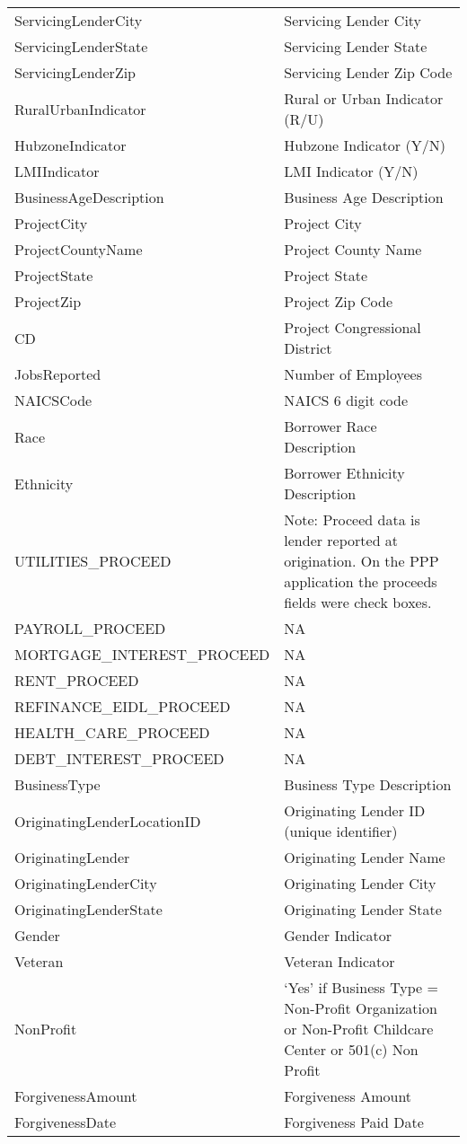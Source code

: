\documentclass[
  letterpaper,
  DIV=11,
  numbers=noendperiod]{scrartcl}
\begin{document}
\begin{longtable}[]{@{}
  >{\raggedright\arraybackslash}p{}
  >{\raggedright\arraybackslash}p{}@{}}
ServicingLenderCity & Servicing Lender City \\
ServicingLenderState & Servicing Lender State \\
ServicingLenderZip & Servicing Lender Zip Code \\
RuralUrbanIndicator & Rural or Urban Indicator (R/U) \\
HubzoneIndicator & Hubzone Indicator (Y/N) \\
LMIIndicator & LMI Indicator (Y/N) \\
BusinessAgeDescription & Business Age Description \\
ProjectCity & Project City \\
ProjectCountyName & Project County Name \\
ProjectState & Project State \\
ProjectZip & Project Zip Code \\
CD & Project Congressional District \\
JobsReported & Number of Employees \\
NAICSCode & NAICS 6 digit code \\
Race & Borrower Race Description \\
Ethnicity & Borrower Ethnicity Description \\
UTILITIES\_PROCEED & Note: Proceed data is lender reported at
origination. On the PPP application the proceeds fields were check
boxes. \\
PAYROLL\_PROCEED & NA \\
MORTGAGE\_INTEREST\_PROCEED & NA \\
RENT\_PROCEED & NA \\
REFINANCE\_EIDL\_PROCEED & NA \\
HEALTH\_CARE\_PROCEED & NA \\
DEBT\_INTEREST\_PROCEED & NA \\
BusinessType & Business Type Description \\
OriginatingLenderLocationID & Originating Lender ID (unique
identifier) \\
OriginatingLender & Originating Lender Name \\
OriginatingLenderCity & Originating Lender City \\
OriginatingLenderState & Originating Lender State \\
Gender & Gender Indicator \\
Veteran & Veteran Indicator \\
NonProfit & `Yes' if Business Type = Non-Profit Organization or
Non-Profit Childcare Center or 501(c) Non Profit \\
ForgivenessAmount & Forgiveness Amount \\
ForgivenessDate & Forgiveness Paid Date \\
\bottomrule()
\end{longtable}
\end{document}
